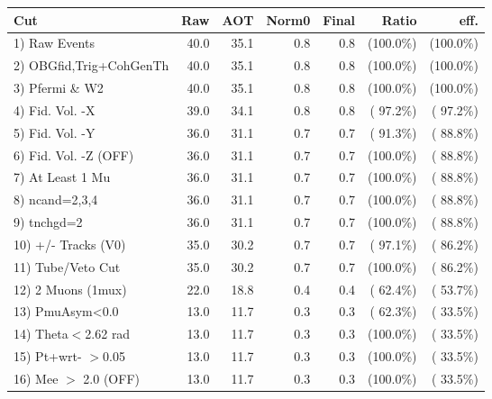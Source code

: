  \begin{table}[h!]\centering
 \begin{tabular}{||l||r|r|r|r|r|r||}
 \hline
 \hline
 Cut & Raw & AOT & Norm0 & Final & Ratio & eff.       \\
 \hline
  1) Raw Events           &         40.0 &         35.1 &          0.8 &          0.8 & (100.0\%) & (100.0\%) \\
  2) OBGfid,Trig+CohGenTh &         40.0 &         35.1 &          0.8 &          0.8 & (100.0\%) & (100.0\%) \\
  3) Pfermi \& W2         &         40.0 &         35.1 &          0.8 &          0.8 & (100.0\%) & (100.0\%) \\
  4) Fid. Vol. -X         &         39.0 &         34.1 &          0.8 &          0.8 & ( 97.2\%) & ( 97.2\%) \\
  5) Fid. Vol. -Y         &         36.0 &         31.1 &          0.7 &          0.7 & ( 91.3\%) & ( 88.8\%) \\
  6) Fid. Vol. -Z (OFF)   &         36.0 &         31.1 &          0.7 &          0.7 & (100.0\%) & ( 88.8\%) \\
  7) At Least 1 Mu        &         36.0 &         31.1 &          0.7 &          0.7 & (100.0\%) & ( 88.8\%) \\
  8) ncand=2,3,4          &         36.0 &         31.1 &          0.7 &          0.7 & (100.0\%) & ( 88.8\%) \\
  9) tnchgd=2             &         36.0 &         31.1 &          0.7 &          0.7 & (100.0\%) & ( 88.8\%) \\
 10) +/- Tracks (V0)      &         35.0 &         30.2 &          0.7 &          0.7 & ( 97.1\%) & ( 86.2\%) \\
 11) Tube/Veto Cut        &         35.0 &         30.2 &          0.7 &          0.7 & (100.0\%) & ( 86.2\%) \\
 12) 2 Muons (1mux)       &         22.0 &         18.8 &          0.4 &          0.4 & ( 62.4\%) & ( 53.7\%) \\
 13) PmuAsym<0.0          &         13.0 &         11.7 &          0.3 &          0.3 & ( 62.3\%) & ( 33.5\%) \\
 14) Theta$<$2.62 rad     &         13.0 &         11.7 &          0.3 &          0.3 & (100.0\%) & ( 33.5\%) \\
 15) Pt+wrt- $>$0.05      &         13.0 &         11.7 &          0.3 &          0.3 & (100.0\%) & ( 33.5\%) \\
 16) Mee $>$ 2.0  (OFF)   &         13.0 &         11.7 &          0.3 &          0.3 & (100.0\%) & ( 33.5\%) \\

\end{tabular}
\end{table}
